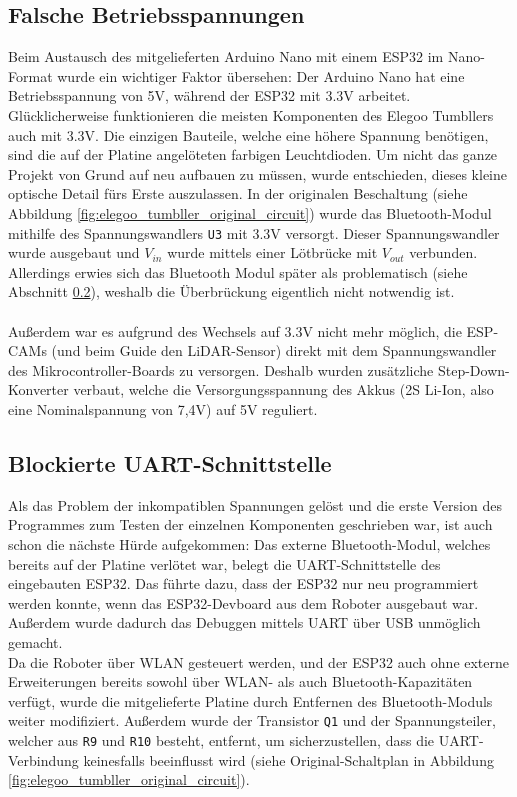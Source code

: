 \subsection{Falsche Betriebsspannungen}
\label{subsec:problem_betriebsspannungen}
Beim Austausch des mitgelieferten Arduino Nano mit einem ESP32 im Nano-Format wurde ein wichtiger Faktor übersehen:
%
Der Arduino Nano hat eine Betriebsspannung von 5V,
während der ESP32 mit 3.3V arbeitet.
%
Glücklicherweise funktionieren die meisten Komponenten des Elegoo Tumbllers auch mit 3.3V.
%
Die einzigen Bauteile,
welche eine höhere Spannung benötigen,
sind die auf der Platine angelöteten farbigen Leuchtdioden.
%
Um nicht das ganze Projekt von Grund auf neu aufbauen zu müssen,
wurde entschieden,
dieses kleine optische Detail fürs Erste auszulassen.
%
In der originalen Beschaltung (siehe Abbildung \ref{fig:elegoo_tumbller_original_circuit})
wurde das Bluetooth-Modul mithilfe des Spannungswandlers \texttt{U3} mit 3.3V versorgt.
%
Dieser Spannungswandler wurde ausgebaut und $V_{in}$ wurde mittels einer Lötbrücke mit $V_{out}$ verbunden.
Allerdings erwies sich das Bluetooth Modul später als problematisch (siehe Abschnitt \ref{subsec:problem_bluetooth_serial}),
weshalb die Überbrückung eigentlich nicht notwendig ist.
\\\\
Außerdem war es aufgrund des Wechsels auf 3.3V nicht mehr möglich,
die ESP-CAMs (und beim Guide den LiDAR-Sensor)
direkt mit dem Spannungswandler des Mikrocontroller-Boards zu versorgen.
%
Deshalb wurden zusätzliche Step-Down-Konverter verbaut,
welche die Versorgungsspannung des Akkus (2S Li-Ion, also eine Nominalspannung von 7,4V) auf 5V reguliert.
\subsection{Blockierte UART-Schnittstelle}
\label{subsec:problem_bluetooth_serial}
Als das Problem der inkompatiblen Spannungen gelöst
und die erste Version des Programmes zum Testen der einzelnen Komponenten geschrieben war,
%
ist auch schon die nächste Hürde aufgekommen:
%
Das externe Bluetooth-Modul,
welches bereits auf der Platine verlötet war,
belegt die UART-Schnittstelle des eingebauten ESP32.
%
Das führte dazu, dass der ESP32 nur neu programmiert werden konnte,
wenn das ESP32-Devboard aus dem Roboter ausgebaut war.
%
Außerdem wurde dadurch das Debuggen mittels UART über USB unmöglich gemacht.
\\
Da die Roboter über WLAN gesteuert werden,
und der ESP32 auch ohne externe Erweiterungen bereits sowohl über WLAN- als auch Bluetooth-Kapazitäten verfügt,
wurde die mitgelieferte Platine durch Entfernen des Bluetooth-Moduls weiter modifiziert.
%
Außerdem wurde der Transistor \texttt{Q1} und der Spannungsteiler,
welcher aus \texttt{R9} und \texttt{R10} besteht,
entfernt, um sicherzustellen,
dass die UART-Verbindung keinesfalls beeinflusst wird
(siehe Original-Schaltplan in Abbildung \ref{fig:elegoo_tumbller_original_circuit}).


